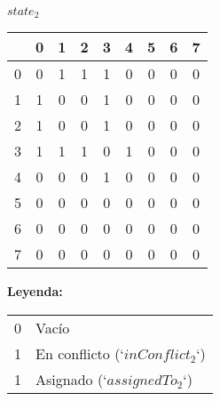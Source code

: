 \documentclass[a4paper,11pt]{article}
\newcommand{\conf}{\cellcolor{yellow!40}1}
\newcommand{\void}{\cellcolor{white}0}
\begin{document}
\begin{center}
    \begin{minipage}{0.5\textwidth}
        \textbf{$state_2$} \\[4pt]
        \begin{tabular}{c|c|c|c|c|c|c|c|c|}
              & \textbf{0} & \textbf{1} & \textbf{2} & \textbf{3} & \textbf{4} & \textbf{5} & \textbf{6} & \textbf{7} \\
            \hline
            0 & \void      & \conf      & \conf      & \conf      & \void      & \void      & \void      & \void      \\
            \hline
            1 & \conf      & \void      & \void      & \conf      & \void      & \void      & \void      & \void      \\
            \hline
            2 & \conf      & \void      & \void      & \conf      & \void      & \void      & \void      & \void      \\
            \hline
            3 & \conf      & \conf      & \conf      & \void      & \conf      & \void      & \void      & \void      \\
            \hline
            4 & \void      & \void      & \void      & \conf      & \void      & \void      & \void      & \void      \\
            \hline
            5 & \void      & \void      & \void      & \void      & \void      & \void      & \void      & \void      \\
            \hline
            6 & \void      & \void      & \void      & \void      & \void      & \void      & \void      & \void      \\
            \hline
            7 & \void      & \void      & \void      & \void      & \void      & \void      & \void      & \void      \\
            \hline
        \end{tabular}
    \end{minipage}
    \begin{minipage}{0.4 \textwidth}
        \textbf{Leyenda:}
        \begin{tabular}{ll}
            \cellcolor{white}0     & Vacío                           \\
            \cellcolor{yellow!40}1 & En conflicto (`$inConflict_2$`) \\
            \cellcolor{gray!30}1   & Asignado (`$assignedTo_2$`)     \\
        \end{tabular}
    \end{minipage}

\end{center}
\end{document}
